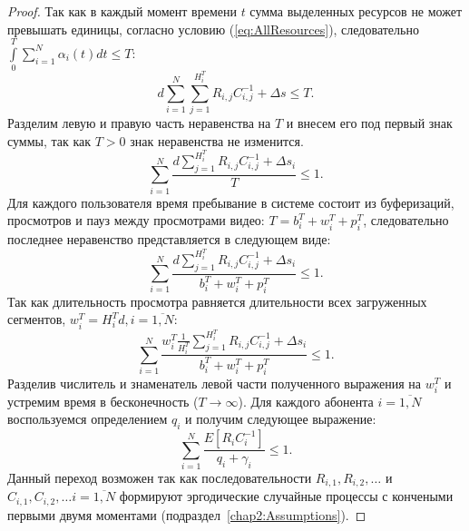 \begin{proof}
Так как в каждый момент времени $t$ сумма выделенных ресурсов не может превышать единицы, согласно условию (\ref{eq:AllResources}), следовательно $\int\limits_{0}^{T}\sum\limits_{i=1}^{N}\alpha_i(t)dt \leq T$:
\begin{equation}
	\nonumber
	d\sum\limits_{i=1}^{N}\sum\limits_{j=1}^{H_i^T}R_{i,j}C_{i,j}^{-1} + \Delta s \leq T.
\end{equation}
Разделим левую и правую часть неравенства на $T$ и внесем его под первый знак суммы, так как $T>0$ знак неравенства не изменится.
\begin{equation}
	\nonumber
	\sum\limits_{i=1}^{N}{\frac{d\sum\limits_{j=1}^{H_i^T}R_{i,j}C_{i,j}^{-1} + \Delta s_i}{T}} \leq 1.
\end{equation}
Для каждого пользователя время пребывание в системе состоит из буферизаций, просмотров и пауз между просмотрами видео: $T = b_i^T + w_i^T + p_i^T $, следовательно последнее неравенство представляется в следующем виде:
\begin{equation}
	\nonumber
	 \sum\limits_{i=1}^{N}{\frac{d\sum\limits_{j=1}^{H_i^T}R_{i,j}C_{i,j}^{-1} + \Delta s_i}{b_i^T + w_i^T + p_i^T}} \leq 1.
\end{equation}
Так как длительность просмотра равняется длительности всех загруженных сегментов, $w_i^T = H_i^T d,i=\overline{1,N}$:
\begin{equation}
	\nonumber
	\sum\limits_{i=1}^{N}\frac{w_i^T \frac{1}{H_i^T}\sum\limits_{j=1}^{H_i^T}R_{i,j}C_{i,j}^{-1} + \Delta s_i}{b_i^T + w_i^T + p_i^T} \leq 1.
\end{equation}
Разделив числитель и знаменатель левой части полученного выражения на $w_i^T$ и устремим время в бесконечность ($T\rightarrow\infty$). Для каждого абонента $i = \overline{1,N}$ воспользуемся определением $q_i$ и получим следующее выражение:
\begin{equation}
	\nonumber
	\sum\limits_{i=1}^{N}\frac{E\left[R_{i}C_{i}^{-1}\right] }{q_i + \gamma_i} \leq 1.
\end{equation}
Данный переход возможен так как последовательности $R_{i,1}, R_{i,2}, \ldots$ и $C_{i,1}, C_{i,2}, \ldots i=\overline{1,N}$ формируют эргодические случайные процессы с кончеными первыми двумя моментами (подраздел~\ref{chap2:Assumptions}).


\end{proof}

